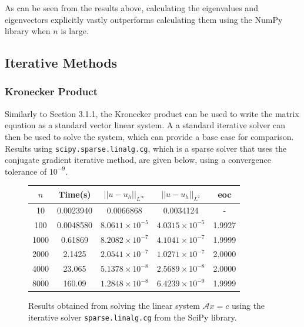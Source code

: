 \documentclass{article}
\numberwithin{equation}{section}
\begin{document}
As can be seen from the results above, calculating the eigenvalues and eigenvectors explicitly vastly outperforms calculating them using the NumPy library when $n$ is large.

\subsection{Iterative Methods}

\subsubsection{Kronecker Product}
Similarly to Section 3.1.1, the Kronecker product can be used to write the matrix equation as a standard vector linear system. A a standard iterative solver can then be used to solve the system, which can provide a base case for comparison. Results using \texttt{scipy.sparse.linalg.cg}, which is a sparse solver that uses the conjugate gradient iterative method, are given below, using a convergence tolerance of $10^{-9}$.

\begin{figure}
\begin{table}[H]
\centering
\begin{tabular}{|c|c|c|c|c|}
\hline
$n$ & Time(s) & $|| u - u_h ||_{L^{\infty}}$ &$|| u - u_h ||_{L^{2}}$ & eoc \\
\hline
10 & 0.0023940 & 0.0066868 & 0.0034124 & - \\
100 & 0.0048580 & $8.0611 \times 10^{-5}$ & $4.0315 \times 10^{-5}$ & 1.9927 \\
1000 & 0.61869 & $8.2082 \times 10^{-7}$ & $4.1041 \times 10^{-7}$ & 1.9999 \\
2000 & 2.1425 & $2.0541 \times 10^{-7}$ & $1.0271 \times 10^{-7}$ & 2.0000 \\
4000 & 23.065 & $5.1378 \times 10^{-8}$ & $2.5689 \times 10^{-8}$ & 2.0000 \\
8000 & 160.09 & $1.2848 \times 10^{-8}$ & $6.4239 \times 10^{-9}$ & 1.9999 \\
\hline
\end{tabular}
\end{table}
\caption{Results obtained from solving the linear system $\mathcal{A} x = c$ using the iterative solver  \texttt{sparse.linalg.cg} from the SciPy library.}
\end{figure}
\end{document}
